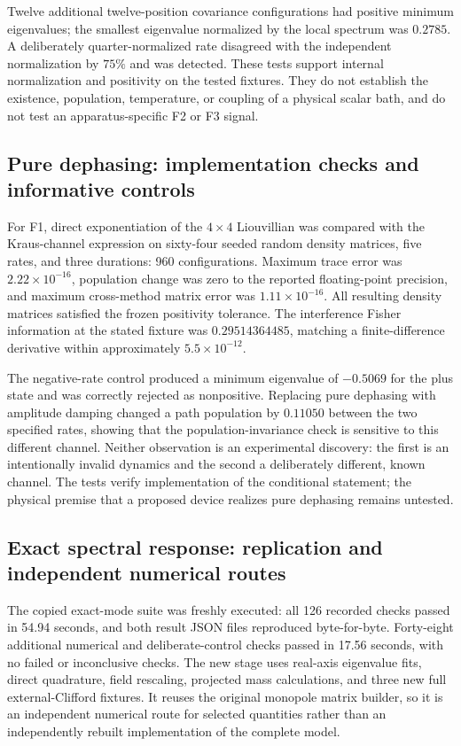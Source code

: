 Twelve additional twelve-position covariance configurations had positive minimum eigenvalues; the smallest eigenvalue normalized by the local spectrum was $0.2785$. A deliberately quarter-normalized rate disagreed with the independent normalization by $75\%$ and was detected. These tests support internal normalization and positivity on the tested fixtures. They do not establish the existence, population, temperature, or coupling of a physical scalar bath, and do not test an apparatus-specific F2 or F3 signal.

\subsection{Pure dephasing: implementation checks and informative controls}
For F1, direct exponentiation of the $4\times4$ Liouvillian was compared with the Kraus-channel expression on sixty-four seeded random density matrices, five rates, and three durations: 960 configurations. Maximum trace error was $2.22\times10^{-16}$, population change was zero to the reported floating-point precision, and maximum cross-method matrix error was $1.11\times10^{-16}$. All resulting density matrices satisfied the frozen positivity tolerance. The interference Fisher information at the stated fixture was $0.29514364485$, matching a finite-difference derivative within approximately $5.5\times10^{-12}$.

The negative-rate control produced a minimum eigenvalue of $-0.5069$ for the plus state and was correctly rejected as nonpositive. Replacing pure dephasing with amplitude damping changed a path population by $0.11050$ between the two specified rates, showing that the population-invariance check is sensitive to this different channel. Neither observation is an experimental discovery: the first is an intentionally invalid dynamics and the second a deliberately different, known channel. The tests verify implementation of the conditional statement; the physical premise that a proposed device realizes pure dephasing remains untested.

\subsection{Exact spectral response: replication and independent numerical routes}
The copied exact-mode suite was freshly executed: all 126 recorded checks passed in 54.94 seconds, and both result JSON files reproduced byte-for-byte. Forty-eight additional numerical and deliberate-control checks passed in 17.56 seconds, with no failed or inconclusive checks. The new stage uses real-axis eigenvalue fits, direct quadrature, field rescaling, projected mass calculations, and three new full external-Clifford fixtures. It reuses the original monopole matrix builder, so it is an independent numerical route for selected quantities rather than an independently rebuilt implementation of the complete model.

